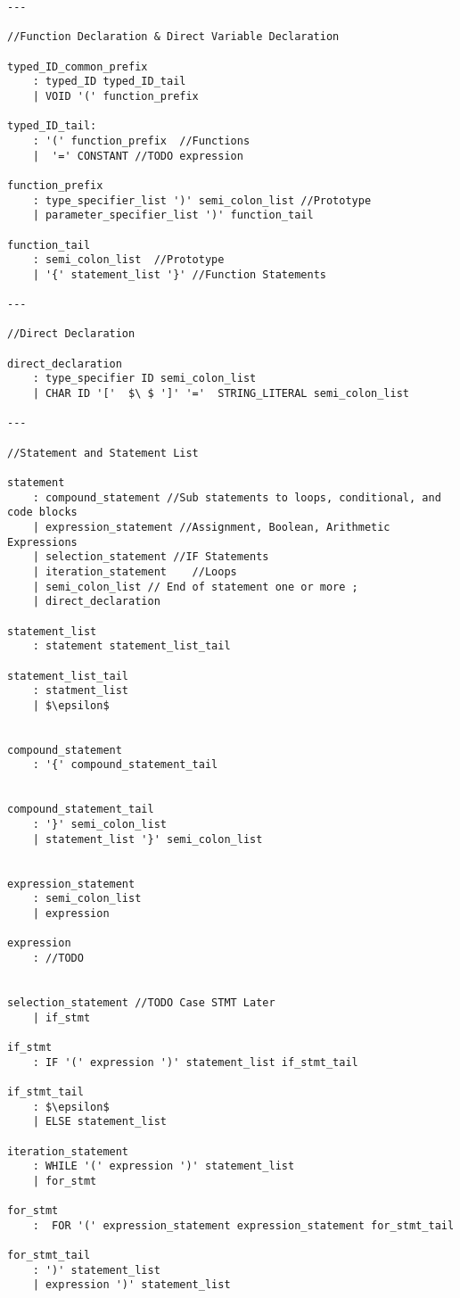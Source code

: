 \documentclass[12pt, letterpaper]{article}
\begin{document}
\begin{lstlisting}[mathescape=true]
---

//Function Declaration & Direct Variable Declaration

typed_ID_common_prefix
	: typed_ID typed_ID_tail
	| VOID '(' function_prefix
	
typed_ID_tail:
	: '(' function_prefix  //Functions
	|  '=' CONSTANT //TODO expression

function_prefix
	: type_specifier_list ')' semi_colon_list //Prototype
	| parameter_specifier_list ')' function_tail
	
function_tail
	: semi_colon_list  //Prototype
	| '{' statement_list '}' //Function Statements

---

//Direct Declaration 

direct_declaration
	: type_specifier ID semi_colon_list
	| CHAR ID '['  $\ $ ']' '='  STRING_LITERAL semi_colon_list
	
---

//Statement and Statement List	
	
statement
	: compound_statement //Sub statements to loops, conditional, and code blocks
	| expression_statement //Assignment, Boolean, Arithmetic Expressions
	| selection_statement //IF Statements
	| iteration_statement	 //Loops
	| semi_colon_list // End of statement one or more ;
	| direct_declaration
			
statement_list
	: statement statement_list_tail

statement_list_tail
	: statment_list
	| $\epsilon$
	

compound_statement
	: '{' compound_statement_tail
	
	
compound_statement_tail
	: '}' semi_colon_list
	| statement_list '}' semi_colon_list
	

expression_statement
	: semi_colon_list
	| expression

expression
	: //TODO	
	
	
selection_statement //TODO Case STMT Later
	| if_stmt
	
if_stmt
	: IF '(' expression ')' statement_list if_stmt_tail

if_stmt_tail
	: $\epsilon$
	| ELSE statement_list 	
	
iteration_statement
	: WHILE '(' expression ')' statement_list
	| for_stmt

for_stmt
	:  FOR '(' expression_statement expression_statement for_stmt_tail
	
for_stmt_tail
	: ')' statement_list
	| expression ')' statement_list	

\end{lstlisting}
\end{document}
